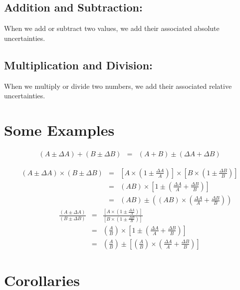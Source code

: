 	\subsection{Addition and Subtraction:}

		When we add or subtract two values, we add their associated absolute uncertainties.

	\subsection{Multiplication and Division:}

		When we multiply or divide two numbers, we add their associated relative uncertainties. 

\section{Some Examples}
	\begin{eqnarray*}
		\left(A \pm \Delta A\right)+\left(B \pm \Delta B\right)&=&\left(A+B\right) \pm \left(\Delta A + \Delta B\right)
	\end{eqnarray*}
	
	\begin{eqnarray*}
		\left(A \pm \Delta A\right) \times \left(B \pm \Delta B\right)&=&
			\left[A \times \left(1 \pm \frac{\Delta A}{A}\right)\right] \times 
			\left[B \times \left(1 \pm \frac{\Delta B}{B}\right)\right]\\
		&=&\left(AB\right)\times\left[1 \pm \left(\frac{\Delta A}{A}+
			\frac{\Delta B}{B}\right)\right]\\
		&=&\left(AB\right) \pm\left(\left(AB\right)\times \left(\frac{\Delta A}{A}+
			\frac{\Delta B}{B}\right)\right)
	\end {eqnarray*}
	\begin{eqnarray*}
		\frac{\left(A \pm \Delta A\right)}{\left(B \pm \Delta B\right)}&=&
			\frac{\left[A \times \left(1 \pm \frac{\Delta A}{A}\right)\right]}{\left[B \times 
			\left(1 \pm \frac{\Delta B}{B}\right)\right]}\\
		&=&\left(\frac{A}{B}\right)\times\left[1 \pm \left(\frac{\Delta A}{A}+\frac{\Delta B}{B}\right)\right]\\
		&=&\left(\frac{A}{B}\right) \pm\left[\left(\frac{A}{B}\right)\times 
			\left(\frac{\Delta A}{A}+\frac{\Delta B}{B}\right)\right]
	\end {eqnarray*}
	
\section{Corollaries}
